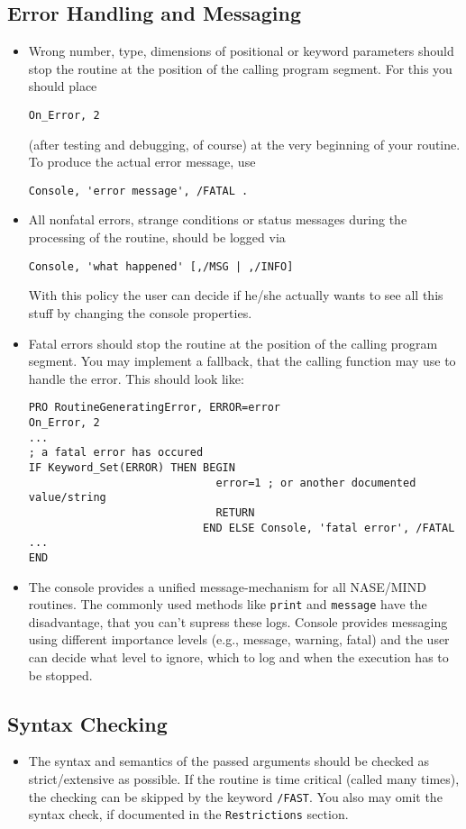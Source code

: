 \documentclass[12pt]{article}
\begin{document}
\subsection{Error Handling and Messaging}
\begin{itemize}
%
\item Wrong number, type, dimensions of positional or keyword parameters should stop the routine at the position of the calling program segment. For this you should place 
\begin{verbatim}
On_Error, 2
\end{verbatim}
(after testing and debugging, of course) at the very beginning of your routine. To produce the actual error message, use
\begin{verbatim}
Console, 'error message', /FATAL .
\end{verbatim}
%
\item All nonfatal errors, strange conditions or status messages during the processing of the routine, should be logged via
\begin{verbatim}
Console, 'what happened' [,/MSG | ,/INFO] 
\end{verbatim}
With this policy the user can decide if he/she actually wants to see all this stuff by changing the console properties.
%
\item Fatal errors should stop the routine at the position of the calling program segment. You may implement a fallback, that the calling function may use to handle the error. This should look like:
\begin{verbatim}
PRO RoutineGeneratingError, ERROR=error
On_Error, 2
...
; a fatal error has occured
IF Keyword_Set(ERROR) THEN BEGIN
                             error=1 ; or another documented value/string
                             RETURN
                           END ELSE Console, 'fatal error', /FATAL
...
END
\end{verbatim}
%
\item The console provides a unified message-mechanism for all
  NASE/MIND routines. The commonly used methods like \texttt{print} and
  \texttt{message} have the disadvantage, that you can't supress these
  logs. Console provides messaging using different importance levels
  (e.g., message, warning, fatal) and the user can decide what level
  to ignore, which to log and when the execution has to be stopped.
\end{itemize}
\subsection{Syntax Checking}
\begin{itemize}
\item The syntax and semantics of the passed arguments should be checked as strict/extensive as possible. If the routine is time critical (called many times), the checking can be skipped by the keyword \texttt{/FAST}. You also may omit the syntax check, if documented in the \texttt{Restrictions} section. 
\end{itemize}
\end{document}

